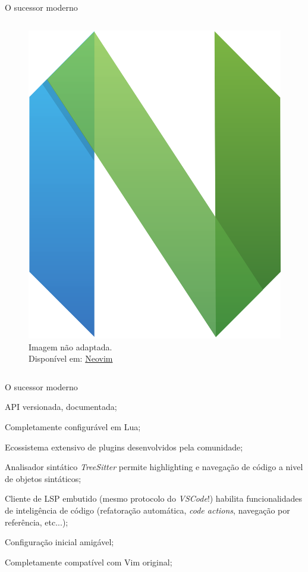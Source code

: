 \begin{frame}{O sucessor moderno}
\begin{columns}
        \begin{column}{0.6\textwidth}
            \begin{figure}
                \centering
                \includegraphics[height=0.6\linewidth]{Image/neovim-logo.png}
                \label{neovim-logo-1}
                \footnotesize
                \\ Imagem não adaptada. \\
                Disponível em:  \hyperlink{https://neovim.io}{Neovim}
            \end{figure}
        \end{column}
    \end{columns}
\end{frame}

\begin{frame}{O sucessor moderno}
    \begin{widedescription}
        \item API versionada, documentada;
        \item Completamente configurável em Lua; 
        \item Ecossistema extensivo de plugins desenvolvidos pela comunidade; \item Analisador sintático \textit{TreeSitter} permite highlighting e navegação de código a nivel de objetos sintáticos;
        \item Cliente de LSP embutido (mesmo protocolo do \textit{VSCode}!) habilita funcionalidades de inteligência de
          código (refatoração automática, \textit{code actions}, navegação por referência, etc...);
        \item Configuração inicial amigável;
        \item Completamente compatível com Vim original;
    \end{widedescription}
\end{frame}

